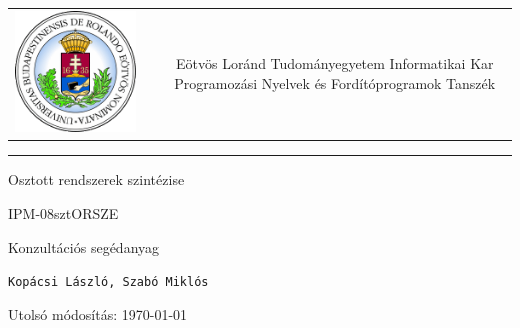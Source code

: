 \documentclass[12pt]{article}
\begin{document}
	
	
	\begin{titlepage}
		\vspace*{0cm}
		\centering
		\begin{tabular}{cp{1cm}c}
			\begin{minipage}{4cm}
				\vspace{0pt}
				\includegraphics[width=1\textwidth]{elte_cimer}
			\end{minipage} & &
			\begin{minipage}{7cm}
				\vspace{0pt}Eötvös Loránd Tudományegyetem \vspace{10pt} \newline
				Informatikai Kar \vspace{10pt} \newline
				Programozási Nyelvek és Fordítóprogramok Tanszék
			\end{minipage}
		\end{tabular}
		
		\vspace*{0.2cm}
		\rule{\textwidth}{1pt}
		
		\vspace*{3cm}
		{\Huge Osztott rendszerek szintézise }
		
		\vspace*{0.5cm}
		{\normalsize IPM-08sztORSZE}
		
		\vspace{2cm}
		{\huge Konzultációs segédanyag}
		
		\vspace*{5cm}
		
		{\large \verb|Kopácsi László, Szabó Miklós|}
		
		\vfill
		
		\vspace*{1cm}
		Utolsó módosítás: \today
	\end{titlepage}
	
\end{document}
